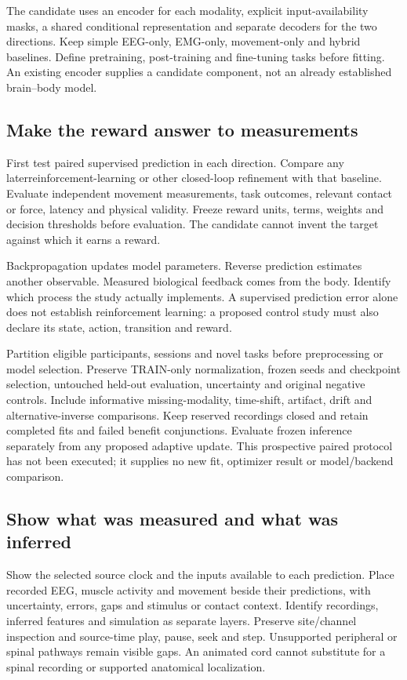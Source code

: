The candidate uses an encoder for each modality, explicit input-availability
masks, a shared conditional representation and separate decoders for the two
directions. Keep simple EEG-only, EMG-only, movement-only and hybrid baselines.
Define pretraining, post-training and fine-tuning tasks before fitting. An
existing encoder supplies a candidate component, not an already established
brain--body model.

\subsection{Make the reward answer to measurements}

First test paired supervised prediction in each direction. Compare any later\linebreak[4]
reinforcement-learning or other closed-loop refinement with that baseline.
Evaluate independent movement measurements, task outcomes, relevant contact or
force, latency and physical validity. Freeze reward units, terms, weights and
decision thresholds before evaluation. The candidate cannot invent the target
against which it earns a reward.

Backpropagation updates model parameters. Reverse prediction estimates another
observable. Measured biological feedback comes from the body. Identify which
process the study actually implements. A supervised prediction error alone does
not establish reinforcement learning: a proposed control study must also declare
its state, action, transition and reward.

Partition eligible participants, sessions and novel tasks before preprocessing
or model selection. Preserve TRAIN-only normalization, frozen seeds and
checkpoint selection, untouched held-out evaluation, uncertainty and original
negative controls. Include informative missing-modality, time-shift, artifact,
drift and alternative-inverse comparisons. Keep reserved recordings closed and
retain completed fits and failed benefit conjunctions. Evaluate frozen inference
separately from any proposed adaptive update. This prospective paired protocol has not been executed; it supplies no new fit, optimizer result or model/backend comparison.

\subsection{Show what was measured and what was inferred}

Show the selected source clock and the inputs available to each prediction.
Place recorded EEG, muscle activity and movement beside their predictions, with
uncertainty, errors, gaps and stimulus or contact context. Identify recordings,
inferred features and simulation as separate layers. Preserve site/channel
inspection and source-time play, pause, seek and step. Unsupported peripheral
or spinal pathways remain visible gaps. An animated cord cannot substitute for
a spinal recording or supported anatomical localization.